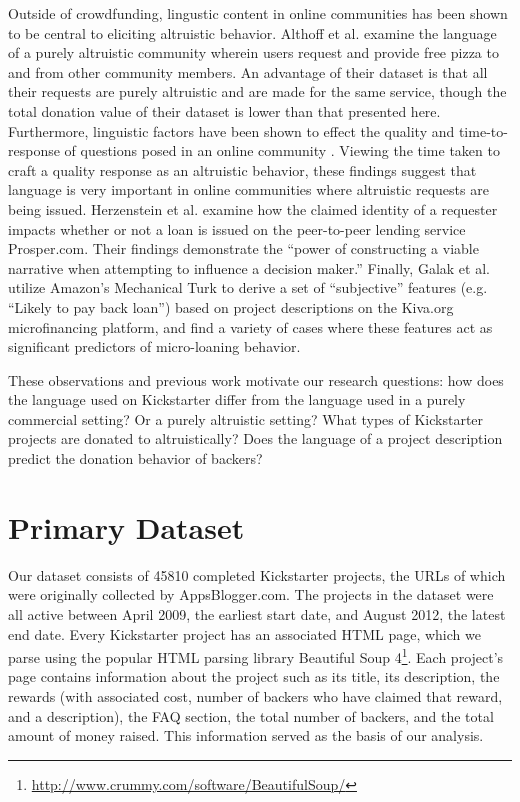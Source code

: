 \documentclass[letterpaper]{article}
\begin{document}
Outside of crowdfunding, lingustic content in online communities has been shown to be central to eliciting altruistic behavior. Althoff et al.  examine the language of a purely altruistic community wherein users request and provide free pizza to and from other community members. An advantage of their dataset is that all their requests are purely altruistic and are made for the same service, though the total donation value of their dataset is lower than that presented here. Furthermore, linguistic factors have been shown to effect the quality and time-to-response of questions posed in an online community \cite{teevan2011factors}. Viewing the time taken to craft a quality response as an altruistic behavior, these findings suggest that language is very important in online communities where altruistic requests are being issued. Herzenstein et al.  examine how the claimed identity of a requester impacts whether or not a loan is issued on the peer-to-peer lending service Prosper.com. Their findings demonstrate the ``power of constructing a viable narrative when attempting to influence a decision maker.'' Finally, Galak et al.  utilize Amazon's Mechanical Turk to derive a set of ``subjective'' features (e.g. ``Likely to pay back loan'') based on project descriptions on the Kiva.org microfinancing platform, and find a variety of cases where these features act as significant predictors of micro-loaning behavior.

These observations and previous work motivate our research questions: how does the language used on Kickstarter differ from the language used in a purely commercial setting? Or a purely altruistic setting? What types of Kickstarter projects are donated to altruistically? Does the language of a project description predict the donation behavior of backers?
\section{Primary Dataset}
Our dataset consists of 45810 completed Kickstarter projects, the URLs of which were originally collected by AppsBlogger.com. The projects in the dataset were all active between April 2009, the earliest start date, and August 2012, the latest end date. Every Kickstarter project has an associated HTML page, which we parse using the popular HTML parsing library Beautiful Soup 4\footnote{\url{http://www.crummy.com/software/BeautifulSoup/}}. Each project's page contains information about the project such as its title, its description, the rewards (with associated cost, number of backers who have claimed that reward, and a description), the FAQ section, the total number of backers, and the total amount of money raised. This information served as the basis of our analysis.
\end{document}
